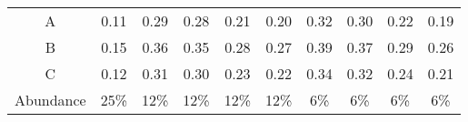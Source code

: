 \begin{tabular}{cccccccccc}
   \hline
A & 0.11 & 0.29 & 0.28 & 0.21 & 0.20 & 0.32 & 0.30 & 0.22 & 0.19 \\ 
  B & 0.15 & 0.36 & 0.35 & 0.28 & 0.27 & 0.39 & 0.37 & 0.29 & 0.26 \\ 
  C & 0.12 & 0.31 & 0.30 & 0.23 & 0.22 & 0.34 & 0.32 & 0.24 & 0.21 \\ 
  Abundance & 25\% & 12\% & 12\% & 12\% & 12\% & 6\% & 6\% & 6\% & 6\% \\ 
   \hline
\end{tabular}
